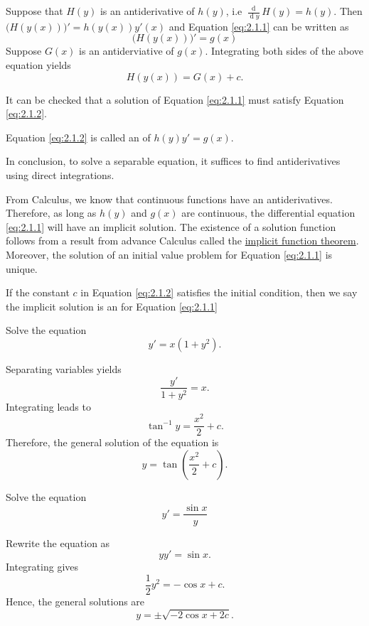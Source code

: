 Suppose that $H(y)$ is an antiderivative of $h(y)$, i.e $\frac{\operatorname{d}}{\operatorname{d} y}H(y)=h(y)$. Then $\Big(H(y(x))\Big)'=h(y(x))y'(x)$ and Equation \ref{eq:2.1.1} can be written as
\[\Big(H(y(x))\Big)'=g(x)\]
Suppose $G(x)$ is an antiderviative of $g(x)$. Integrating both sides of the above equation yields
\begin{equation}
  H(y(x))=G(x)+c.
  \label{eq:2.1.2}
\end{equation}

It can be checked that a solution of Equation \ref{eq:2.1.1} must satisfy Equation \ref{eq:2.1.2}.

Equation \ref{eq:2.1.2} is called an  of $h(y)y'=g(x)$.

In conclusion, to solve a separable equation, it suffices to find antiderivatives using direct integrations.

From Calculus, we know that continuous functions have an antiderivatives. Therefore, as long as $h(y)$ and $g(x)$ are continuous, the differential equation \ref{eq:2.1.1} will have an implicit solution. The existence of a solution function follows from a result from advance Calculus called the \href{https://math.libretexts.org/Bookshelves/Differential_Equations/Book\%3A_Elementary_Differential_Equations_with_Boundary_Value_Problems_(Trench)/02\%3A_First_Order_Equations/2.02\%3A_Separable_Equations}{implicit function theorem}.
Moreover, the solution of an initial value problem for Equation \ref{eq:2.1.1} is unique.

If the constant $c$ in Equation \ref{eq:2.1.2} satisfies the initial condition, then we say the implicit solution is an  for Equation \ref{eq:2.1.1}

\begin{example}
  Solve the equation
  \[y'=x(1+y^2).\]
\end{example}
\begin{solution}
Separating variables yields
\[\frac{y'}{1+y^2}=x.\]
Integrating leads to
\[\tan^{-1}y=\frac{x^2}2 + c.\]
Therefore, the general solution of the equation is
\[y=\tan\left(\frac{x^2}{2}+c\right).\]
\end{solution}

\begin{exercise}
  Solve the equation
  $$y'  = \frac{\sin x}{y}$$
  \end{exercise}
  
  \begin{exersol}
  Rewrite the equation as
  $$yy' = \sin x.$$
  Integrating gives
  $$\frac{1}{2}y^2 =  -\cos x + c.$$
  Hence, the general solutions are
  $$y = \pm \sqrt{- 2\cos x + 2c}.$$
  \end{exersol}
  
